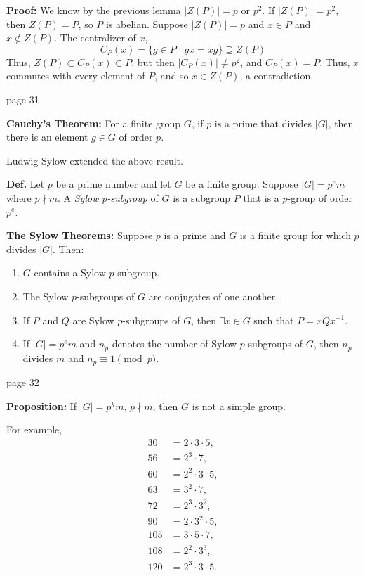 \documentclass{article}
\begin{document}
\textbf{Proof:} We know by the previous lemma $|Z(P)| = p \text{ or } p^2$.
If $|Z(P)| = p^2$, then $Z(P) = P$, so $P$ is abelian.
Suppose $|Z(P)| = p$ and $x \in P$ and $x \notin Z(P)$.
The centralizer of $x$,
\[
C_P(x) = \{ g \in P \mid gx = xg \} \supseteq Z(P)
\]
Thus, $Z(P) \subset C_P(x) \subset P$, but then $|C_P(x)| \neq p^2$, and $C_P(x) = P$.
Thus, $x$ commutes with every element of $P$, and so $x \in Z(P)$, a contradiction.

\newpage
\noindent page 31

\textbf{Cauchy's Theorem:} For a finite group $G$, if $p$ is a prime that divides $|G|$, then there is an element $g \in G$ of order $p$.

Ludwig Sylow extended the above result.

\textbf{Def.} Let $p$ be a prime number and let $G$ be a finite group. Suppose $|G| = p^em$ where $p \nmid m$. A \textit{Sylow $p$-subgroup} of $G$ is a subgroup $P$ that is a $p$-group of order $p^e$.

\textbf{The Sylow Theorems:} Suppose $p$ is a prime and $G$ is a finite group for which $p$ divides $|G|$. Then:
\begin{enumerate}
    \item $G$ contains a Sylow $p$-subgroup.
    \item The Sylow $p$-subgroups of $G$ are conjugates of one another.
    \item If $P$ and $Q$ are Sylow $p$-subgroups of $G$, then $\exists x \in G$ such that $P = xQx^{-1}$.
    \item If $|G| = p^em$ and $n_p$ denotes the number of Sylow $p$-subgroups of $G$, then $n_p$ divides $m$ and $n_p \equiv 1 \pmod{p}$.
\end{enumerate}

\newpage
\noindent page 32

\textbf{Proposition:} If $|G| = p^km$, $p \nmid m$, then $G$ is not a simple group.

For example,
\[
\begin{aligned}
    30 &= 2 \cdot 3 \cdot 5, \\
    56 &= 2^3 \cdot 7, \\
    60 &= 2^2 \cdot 3 \cdot 5, \\
    63 &= 3^2 \cdot 7, \\
    72 &= 2^3 \cdot 3^2, \\
    90 &= 2 \cdot 3^2 \cdot 5, \\
    105 &= 3 \cdot 5 \cdot 7, \\
    108 &= 2^2 \cdot 3^3, \\
    120 &= 2^3 \cdot 3 \cdot 5.
\end{aligned}
\]
\end{document}
